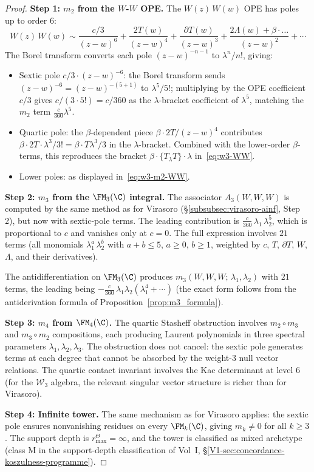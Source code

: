 \begin{proof}
\textbf{Step 1: $m_2$ from the $W$-$W$ OPE.}
The $W(z)\, W(w)$ OPE has poles up to order $6$:
\[
W(z)\, W(w) \sim
\frac{c/3}{(z-w)^6}
+ \frac{2T(w)}{(z-w)^4}
+ \frac{\partial T(w)}{(z-w)^3}
+ \frac{2\Lambda(w) + \beta \cdot \ldots}{(z-w)^2}
+ \cdots
\]
The Borel transform converts each pole
$(z-w)^{-n-1}$ to $\lambda^n/n!$, giving:
\begin{itemize}
\item Sextic pole $c/3 \cdot (z-w)^{-6}$:
 the Borel transform sends $(z{-}w)^{-6} = (z{-}w)^{-(5+1)}$
 to $\lambda^5/5!$; multiplying by the OPE coefficient $c/3$
 gives $c/(3 \cdot 5!) = c/360$ as the $\lambda$-bracket
 coefficient of $\lambda^5$, matching the $m_2$ term
 $\frac{c}{360}\lambda^5$.
\item Quartic pole: the $\beta$-dependent piece
 $\beta \cdot 2T/(z{-}w)^4$ contributes
 $\beta \cdot 2T \cdot \lambda^3/3! = \beta \cdot
 T\lambda^3/3$ in the $\lambda$-bracket. Combined
 with the lower-order $\beta$-terms, this reproduces
 the bracket $\beta \cdot \{T{}_\lambda T\} \cdot \lambda$
 in~\eqref{eq:w3-WW}.
\item Lower poles: as displayed
 in~\eqref{eq:w3-m2-WW}.
\end{itemize}

\medskip
\textbf{Step 2: $m_3$ from the $\FM_3(\C)$ integral.}
The associator $A_3(W,W,W)$ is computed by the
same method as for Virasoro
(\S\ref{subsubsec:virasoro-ainf}, Step 2), but now
with sextic-pole terms. The leading contribution is
$\frac{c}{360}\,\lambda_1\,\lambda_2^5$, which is
proportional to $c$ and vanishes only at $c = 0$.
The full expression involves $21$ terms
(all monomials $\lambda_1^a\, \lambda_2^b$ with
$a + b \le 5$, $a \ge 0$, $b \ge 1$, weighted by
$c$, $T$, $\partial T$, $W$, $\Lambda$, and their
derivatives).

The antidifferentiation on $\FM_3(\C)$ produces
$m_3(W,W,W;\, \lambda_1, \lambda_2)$ with $21$
terms, the leading being
$-\frac{c}{360}\,\lambda_1\lambda_2
(\lambda_1^4 + \cdots)$
(the exact form follows from the antiderivation
formula of Proposition~\ref{prop:m3_formula}).

\medskip
\textbf{Step 3: $m_4$ from $\FM_4(\C)$.}
The quartic Stasheff obstruction involves $m_2 \circ m_3$
and $m_3 \circ m_2$ compositions, each producing
Laurent polynomials in three spectral parameters
$\lambda_1, \lambda_2, \lambda_3$. The obstruction does
not cancel: the sextic pole generates terms at each
degree that cannot be absorbed by the weight-$3$ null
vector relations. The quartic contact invariant
involves the Kac determinant at level $6$ (for the
$\mathcal{W}_3$ algebra, the relevant singular vector
structure is richer than for Virasoro).

\medskip
\textbf{Step 4: Infinite tower.}
The same mechanism as for Virasoro applies: the sextic
pole ensures nonvanishing residues on every
$\FM_k(\C)$, giving $m_k \ne 0$ for all $k \ge 3$.
The support depth is \(r^\Theta_{\max}=\infty\), and the
tower is classified as mixed archetype (class M in
the support-depth classification of Vol~I,
\S\ref*{V1-sec:concordance-koszulness-programme}).
\end{proof}

